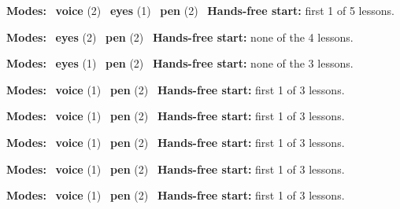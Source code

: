 \expandafter\def\csname hlchaptermodality6\endcsname{%
  {\small\noindent
    \textbf{Modes:} \hlvoicesign{}~\textbf{voice} (2) \quad \hlsightsign{}~\textbf{eyes} (1) \quad \hlpensign{}~\textbf{pen} (2)\quad
    \hlvoicesign{}~\textbf{Hands-free start:} first 1 of 5 lessons.%
    \par}\medskip
}

\expandafter\def\csname hlchaptermodality7\endcsname{%
  {\small\noindent
    \textbf{Modes:} \hlsightsign{}~\textbf{eyes} (2) \quad \hlpensign{}~\textbf{pen} (2)\quad
    \hlvoicesign{}~\textbf{Hands-free start:} none of the 4 lessons.%
    \par}\medskip
}

\expandafter\def\csname hlchaptermodality8\endcsname{%
  {\small\noindent
    \textbf{Modes:} \hlsightsign{}~\textbf{eyes} (1) \quad \hlpensign{}~\textbf{pen} (2)\quad
    \hlvoicesign{}~\textbf{Hands-free start:} none of the 3 lessons.%
    \par}\medskip
}

\expandafter\def\csname hlchaptermodality9\endcsname{%
  {\small\noindent
    \textbf{Modes:} \hlvoicesign{}~\textbf{voice} (1) \quad \hlpensign{}~\textbf{pen} (2)\quad
    \hlvoicesign{}~\textbf{Hands-free start:} first 1 of 3 lessons.%
    \par}\medskip
}

\expandafter\def\csname hlchaptermodality10\endcsname{%
  {\small\noindent
    \textbf{Modes:} \hlvoicesign{}~\textbf{voice} (1) \quad \hlpensign{}~\textbf{pen} (2)\quad
    \hlvoicesign{}~\textbf{Hands-free start:} first 1 of 3 lessons.%
    \par}\medskip
}

\expandafter\def\csname hlchaptermodality11\endcsname{%
  {\small\noindent
    \textbf{Modes:} \hlvoicesign{}~\textbf{voice} (1) \quad \hlpensign{}~\textbf{pen} (2)\quad
    \hlvoicesign{}~\textbf{Hands-free start:} first 1 of 3 lessons.%
    \par}\medskip
}

\expandafter\def\csname hlchaptermodality12\endcsname{%
  {\small\noindent
    \textbf{Modes:} \hlvoicesign{}~\textbf{voice} (1) \quad \hlpensign{}~\textbf{pen} (2)\quad
    \hlvoicesign{}~\textbf{Hands-free start:} first 1 of 3 lessons.%
    \par}\medskip
}

\expandafter\def\csname hlchaptermodality13\endcsname{%
  {\small\noindent
    \textbf{Modes:} \hlvoicesign{}~\textbf{voice} (1) \quad \hlpensign{}~\textbf{pen} (2)\quad
    \hlvoicesign{}~\textbf{Hands-free start:} first 1 of 3 lessons.%
    \par}\medskip
}

